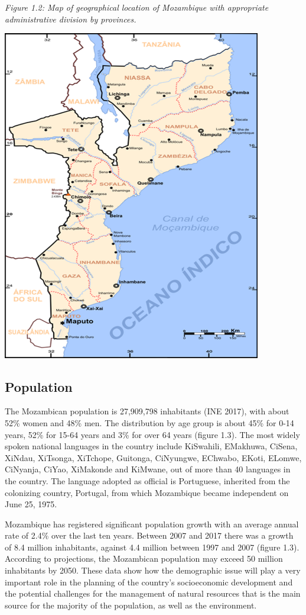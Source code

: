 \documentclass[
]{book}
\begin{document}
\emph{Figure 1.2: Map of geographical location of Mozambique with appropriate administrative division by provinces.}

\includegraphics[width=0.85\textwidth,height=\textheight]{Picture2.png}

\hypertarget{population}{%
\subsection{Population}\label{population}}

The Mozambican population is 27,909,798 inhabitants (INE 2017), with about 52\% women and 48\% men. The distribution by age group is about 45\% for 0-14 years, 52\% for 15-64 years and 3\% for over 64 years (figure 1.3). The most widely spoken national languages in the country include KiSwahili, EMakhuwa, CiSena, XiNdau, XiTsonga, XiTchope, Guitonga, CiNyungwe, EChwabo, EKoti, ELomwe, CiNyanja, CiYao, XiMakonde and KiMwane, out of more than 40 languages in the country. The language adopted as official is Portuguese, inherited from the colonizing country, Portugal, from which Mozambique became independent on June 25, 1975.

Mozambique has registered significant population growth with an average annual rate of 2.4\% over the last ten years. Between 2007 and 2017 there was a growth of 8.4 million inhabitants, against 4.4 million between 1997 and 2007 (figure 1.3). According to projections, the Mozambican population may exceed 50 million inhabitants by 2050. These data show how the demographic issue will play a very important role in the planning of the country's socioeconomic development and the potential challenges for the management of natural resources that is the main source for the majority of the population, as well as the environment.
\end{document}
